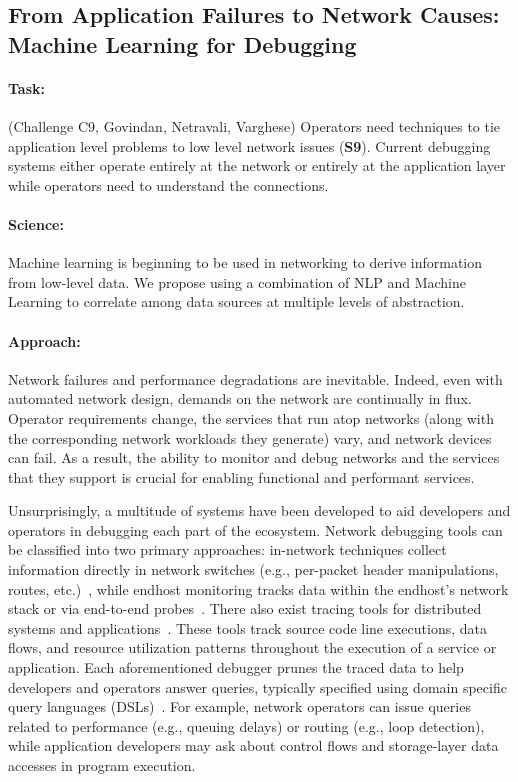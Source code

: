 
\subsection{From Application Failures to Network Causes: Machine Learning for Debugging}

\paragraph*{Task:} (Challenge C9, Govindan, Netravali, Varghese)  
Operators need techniques to tie application level problems to low level network issues (\textbf{S9}).
Current debugging systems either operate entirely at the network or entirely at the application layer while
operators need to understand the connections.

\paragraph*{Science:} Machine learning is beginning to be used in networking to derive information from low-level data.  We propose using a combination of NLP and Machine Learning to correlate among data sources at multiple levels of abstraction.

\paragraph*{Approach:} 
Network failures and performance degradations are inevitable. Indeed, even with
automated network design, demands on the network are continually in flux.
Operator requirements change, the services that run atop networks (along with
the corresponding network workloads they generate) vary, and network devices
can fail. As a result, the ability to monitor and debug networks and the
services that they support is crucial for enabling functional and performant
services.

Unsurprisingly, a multitude of systems have been developed to aid developers
and operators in debugging each part of the ecosystem.  Network debugging tools
can be classified into two primary approaches: in-network techniques collect
information directly in network switches (e.g., per-packet header
manipulations, routes,
etc.)~\cite{xtrace,netsight,pathqueries,marple,sdndebug}, while endhost
monitoring tracks data within the endhost's network stack or via end-to-end
probes~\cite{trumpet,cherrypick,pathdump}.  There also exist tracing tools for
distributed systems and applications~\cite{pivot,polaris,demi,dapper}. These
tools track source code line executions, data flows, and resource utilization
patterns throughout the execution of a service or application. Each
aforementioned debugger prunes the traced data to help developers and operators
answer queries, typically specified using domain specific query languages
(DSLs)~\cite{bsd,pathqueries,marple}. For example, network operators can issue
queries related to performance (e.g., queuing delays) or routing (e.g., loop
detection), while application developers may ask about control flows and
storage-layer data accesses in program execution.


